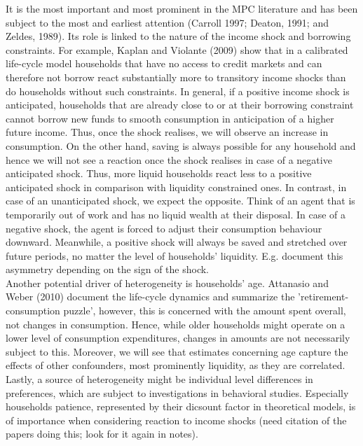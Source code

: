 It is the most important and most prominent in the MPC literature and has been subject to the most and earliest attention (Carroll 1997; Deaton, 1991; and Zeldes, 1989). Its role is linked to the nature of the income shock and borrowing constraints. For example, Kaplan and Violante (2009) show that in a calibrated life-cycle model households that have no access to credit markets and can therefore not borrow react substantially more to transitory income shocks than do households without such constraints. In general, if a positive income shock is anticipated, households that are already close to or at their borrowing constraint cannot borrow new funds to smooth consumption in anticipation of a higher future income. Thus, once the shock realises, we will observe an increase in consumption. On the other hand, saving is always possible for any household and hence we will not see a reaction once the shock realises in case of a negative anticipated shock. Thus, more liquid households react less to a positive anticipated shock in comparison with liquidity constrained ones. In contrast, in case of an unanticipated shock, we expect the opposite. Think of an agent that is temporarily out of work and has no liquid wealth at their disposal. In case of a negative shock, the agent is forced to adjust their consumption behaviour downward. Meanwhile, a positive shock will always be saved and stretched over future periods, no matter the level of households' liquidity. E.g. \cite{bunn_etal} document this asymmetry depending on the sign of the shock. \\
Another potential driver of heterogeneity is households' age. Attanasio and Weber (2010) document the life-cycle dynamics and summarize the 'retirement-consumption puzzle', however, this is concerned with the amount spent overall, not changes in consumption. Hence, while older households might operate on a lower level of consumption expenditures, changes in amounts are not necessarily subject to this. Moreover, we will see that estimates concerning age capture the effects of other confounders, most prominently liquidity, as they are correlated. \\
Lastly, a source of heterogeneity might be individual level differences in preferences, which are subject to investigations in behavioral studies. Especially households patience, represented by their dicsount factor in theoretical models, is of importance when considering reaction to income shocks (need citation of the papers doing this; look for it again in notes).
